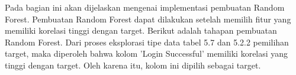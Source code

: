 Pada bagian ini akan dijelaskan mengenai implementasi pembuatan Random Forest. Pembuatan Random Forest dapat dilakukan setelah memilih fitur yang memiliki korelasi tinggi dengan target. Berikut adalah tahapan pembuatan Random Forest.
Dari proses eksplorasi tipe data tabel 5.7 dan 5.2.2 pemilihan target, maka diperoleh bahwa kolom 'Login Successful' memiliki korelasi yang tinggi dengan target. Oleh karena itu, kolom ini dipilih sebagai target.